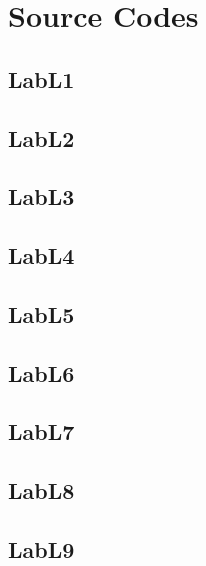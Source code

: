\documentclass{article}
\begin{document}
\section{Source Codes}


\subsection{LabL1}



\subsection{LabL2}



\subsection{LabL3}



\subsection{LabL4}



\subsection{LabL5}



\subsection{LabL6}



\subsection{LabL7}


\subsection{LabL8}



\subsection{LabL9}



\end{document}
